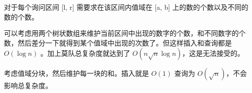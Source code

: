 对于每个询问区间 [l, r] 需要求在该区间内值域在 [a, b] 上的数的个数以及不同的数的个数。

可以考虑用两个树状数组来维护当前区间中出现的数字的个数，和不同数字的个数，然后差分一下就得到某个值域中出现的次数了。但这样插入和查询都是 $O(\log n)$ 。加上莫队总复杂度就达到了 $O(n\sqrt{n}\log n)$，这是无法接受的。

考虑值域分块，然后维护每一块的和。插入就是 $O(1)$ 查询为 $O(\sqrt{n})$，不会影响总复杂度。